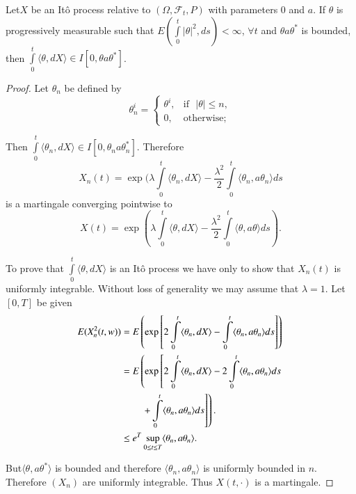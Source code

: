 \begin{lemma}\label{chap26-lem4}
Let\pageoriginale $X$ be an It\^o process relative to
$(\Omega,\mathscr{F}_{t},P)$ with parameters $0$ and $a$. If $\theta$
is progressively measurable such that
$E(\int\limits^{t}_{0}|\theta|^{2},ds)<\infty$, $\forall t$ and
$\theta a\theta^{*}$ is bounded, then $\int\limits^{t}_{0}\langle
\theta, dX\rangle \in I[0,\theta a\theta^{*}]$.
\end{lemma}

\begin{proof}
Let $\theta_{n}$ be defined by
$$
\theta^{i}_{n}=
\begin{cases}
\theta^{i}, & \text{if~ } |\theta|\leq n,\\
0, & \text{otherwise;}
\end{cases}
$$

Then $\int\limits^{t}_{0}\langle \theta_{n},dX\rangle \in
I[0,\theta_{n}a\theta^{*}_{n}]$. Therefore
$$
X_{n}(t)=\exp(\lambda\int\limits^{t}_{0}\langle \theta_{n},dX\rangle
-\frac{\lambda^{2}}{2}\int\limits^{t}_{0}\langle
\theta_{n},a\theta_{n}\rangle ds
$$
is a martingale converging pointwise to
$$
X(t)=\exp \left(\lambda\int\limits^{t}_{0}\langle \theta, dX\rangle
-\frac{\lambda^{2}}{2}\int\limits^{t}_{0}\langle \theta,
a\theta\rangle ds\right).
$$

To prove that $\int\limits^{t}_{0}\langle \theta, dX\rangle$ is an
It\^o process we have only to show that $X_{n}(t)$ is uniformly
integrable. Without loss of generality we may assume that
$\lambda=1$. Let $[0,T]$ be given
\begin{align*}
E(X^{2}_{n}(t,w)) &= E\left(\exp\left[2 \int\limits^{t}_{0}\langle
  \theta_{n},dX\rangle -\int\limits^{t}_{0}\langle
  \theta_{n},a\theta_{n}\rangle ds\right]\right)\\
&= E\left(\exp \left[ 2\int\limits^{t}_{0}\langle \theta_{n},dX\rangle
  -2\int\limits^{t}_{0}\langle \theta_{n},a\theta_{n}\rangle
  ds\right.\right.\\
&\qquad\left.\left. +\int\limits^{t}_{0}\langle
  \theta_{n},a\theta_{n}\rangle ds\right]\right).\\
&\leq e^{T}\sup\limits_{0\leq t\leq T}\langle
\theta_{n},a\theta_{n}\rangle. 
\end{align*}

But\pageoriginale $\langle \theta, a\theta^{*}\rangle$ is bounded and
therefore $\langle \theta_{n},a\theta_{n}\rangle$ is uniformly bounded
in $n$. Therefore $(X_{n})$ are uniformly integrable. Thus
$X(t,\cdot)$ is a martingale.


\end{proof}
